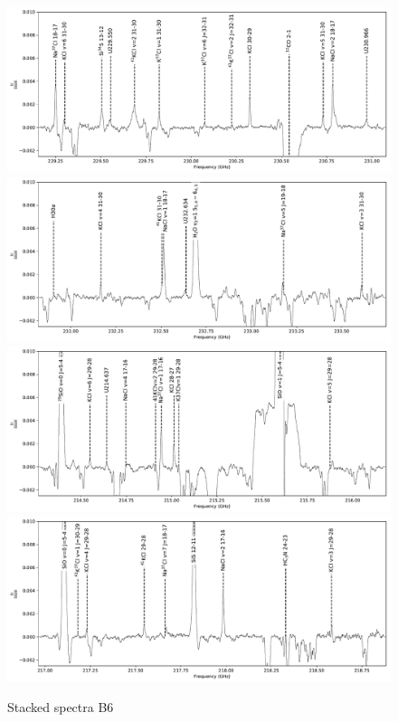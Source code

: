 \documentclass[twocolumn]{aastex62}
\begin{document}
\begin{figure}[!htp]
\includegraphics[scale=1,width=6in]{figures/lines_labeled_OrionSourceI_B6_spw0_robust0.5.pdf}
\includegraphics[scale=1,width=6in]{figures/lines_labeled_OrionSourceI_B6_spw1_robust0.5.pdf}
\includegraphics[scale=1,width=6in]{figures/lines_labeled_OrionSourceI_B6_spw2_robust0.5.pdf}
\includegraphics[scale=1,width=6in]{figures/lines_labeled_OrionSourceI_B6_spw3_robust0.5.pdf}
\caption{Stacked spectra B6}
\label{fig:spectrab6}
\end{figure}
\end{document}
